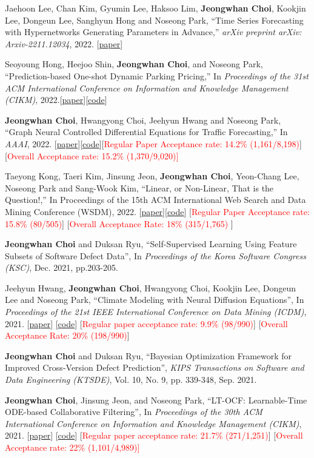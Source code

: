 \documentclass[10pt]{article}
\newenvironment{changemargin}[2]{
  \begin{list}{}{
    \setlength{\topsep}{0pt}
    \setlength{\leftmargin}{#1}
    \setlength{\rightmargin}{#2}
    \setlength{\listparindent}{\parindent}
    \setlength{\itemindent}{\parindent}
    \setlength{\parsep}{\parskip}
  }
  \item[]}{\end{list}
}
\newcommand{\presentation}[2]{
	{#1} \hfill \emph{#2}\\ \bigskip
}
\newcommand{\RED}[1]{\textcolor{red}{#1}}
\newenvironment{body} {
	\vspace*{-16pt}
	\begin{changemargin}{-0.25in}{-0.5in}
  }
	{\end{changemargin}
}
\begin{document}
\begin{body}
\presentation{
Jaehoon Lee, Chan Kim, Gyumin Lee, Haksoo Lim, \textbf{Jeongwhan Choi}, Kookjin Lee, Dongeun Lee, Sanghyun Hong and Noseong Park, ``Time Series Forecasting with Hypernetworks Generating Parameters in Advance,'' \emph{arXiv preprint arXiv: Arxiv-2211.12034}, 2022. [\href{https://arxiv.org/abs/2211.12034}{paper}]}{}
\presentation{Seoyoung Hong, Heejoo Shin, \textbf{Jeongwhan Choi}, and Noseong Park, ``Prediction-based One-shot Dynamic Parking Pricing,'' In \emph{Proceedings of the 31st ACM International Conference on Information and Knowledge Management (CIKM)}, 2022.[\href{https://arxiv.org/abs/2208.14231}{paper}][\href{https://github.com/jeongwhanchoi/one-shot-optimization}{code}]}{}
\presentation{\textbf{Jeongwhan Choi}, Hwangyong Choi, Jeehyun Hwang and Noseong Park, ``Graph Neural Controlled Differential Equations for Traffic Forecasting,'' In \emph{AAAI}, 2022. [\href{https://ojs.aaai.org/index.php/AAAI/article/download/20587/20346}{paper}][\href{https://github.com/jeongwhanchoi/STG-NCDE}{code}][\RED{Regular Paper Acceptance rate: 14.2\% (1,161/8,198)}] [\RED{Overall Acceptance rate: 15.2\% (1,370/9,020)] }} {}
\presentation{Taeyong Kong, Taeri Kim, Jinsung Jeon, \textbf{Jeongwhan Choi}, Yeon-Chang Lee, Noseong Park and Sang-Wook Kim, ``Linear, or Non-Linear, That is the Question!,'' In Proceedings of the 15th ACM International Web Search and Data Mining Conference (WSDM), 2022.  [\href{https://arxiv.org/abs/2111.07265}{paper}][\href{https://github.com/jeongwhanchoi/HMLET}{code}] [\RED{Regular Paper Acceptance rate: 15.8\% (80/505)}] [\RED{Overall Acceptance Rate: 18\%  (315/1,765)} ]}{}
\presentation{\textbf{Jeongwhan Choi} and Duksan Ryu, ``Self-Supervised Learning Using Feature Subsets of Software Defect Data'',  In \emph{Proceedings of the Korea Software Congress (KSC)}, Dec. 2021, pp.203-205.}{}
\presentation{Jeehyun Hwang, \textbf{Jeongwhan Choi}, Hwangyong Choi, Kookjin Lee, Dongeun Lee and Noseong Park, ``Climate Modeling with Neural Diffusion Equations'', In \emph{Proceedings of the 21st IEEE International Conference on Data Mining (ICDM)}, 2021.  [\href{https://arxiv.org/abs/2111.06011}{paper}] [\href{https://github.com/jeongwhanchoi/Neural-Diffusion-Equation}{code}] [\RED{Regular paper acceptance rate: 9.9\%  (98/990)}] [\RED{Overall Acceptance Rate: 20\%  (198/990)}]}{}
\presentation{\textbf{Jeongwhan Choi} and Duksan Ryu, ``Bayesian Optimization Framework for Improved Cross-Version Defect Prediction'', \emph{KIPS Transactions on Software and Data Engineering (KTSDE)}, Vol. 10, No. 9, pp. 339-348, Sep. 2021.}{}
\presentation{\textbf{Jeongwhan Choi}, Jinsung Jeon, and Noseong Park, ``LT-OCF: Learnable-Time ODE-based Collaborative Filtering'', In \emph{Proceedings of the 30th ACM International Conference on Information and Knowledge Management (CIKM)}, 2021. [\href{https://arxiv.org/pdf/2108.06208.pdf}{paper}] [\href{https://github.com/jeongwhanchoi/LT-OCF}{code}]  [\RED{Regular paper acceptance rate: 21.7\% (271/1,251)}]  [\RED{Overall Acceptance rate: 22\% (1,101/4,989)]} }{}

\end{body}
\end{document}
